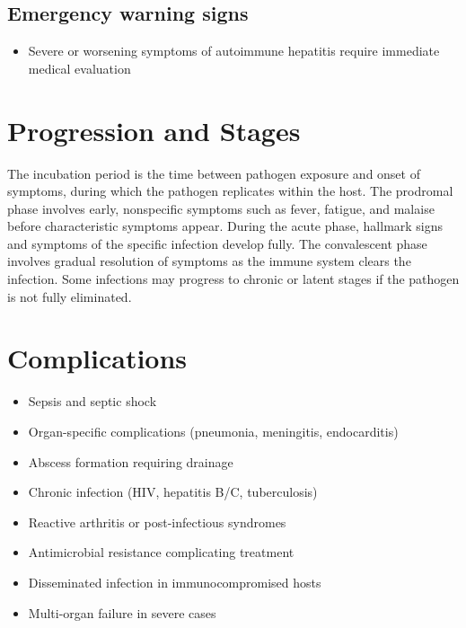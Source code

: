 \subsection{Emergency warning signs}
\begin{itemize}[noitemsep]
  \item Severe or worsening symptoms of autoimmune hepatitis require immediate medical evaluation
\end{itemize}
\section{Progression and Stages}
The incubation period is the time between pathogen exposure and onset of symptoms, during which the pathogen replicates within the host. The prodromal phase involves early, nonspecific symptoms such as fever, fatigue, and malaise before characteristic symptoms appear. During the acute phase, hallmark signs and symptoms of the specific infection develop fully. The convalescent phase involves gradual resolution of symptoms as the immune system clears the infection. Some infections may progress to chronic or latent stages if the pathogen is not fully eliminated.
\section{Complications}
\begin{itemize}[noitemsep]
  \item Sepsis and septic shock
  \item Organ-specific complications (pneumonia, meningitis, endocarditis)
  \item Abscess formation requiring drainage
  \item Chronic infection (HIV, hepatitis B/C, tuberculosis)
  \item Reactive arthritis or post-infectious syndromes
  \item Antimicrobial resistance complicating treatment
  \item Disseminated infection in immunocompromised hosts
  \item Multi-organ failure in severe cases
\end{itemize}
